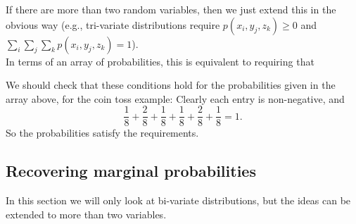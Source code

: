   	\bigskip
	
	\hfil{}
	\bigskip
	\bigskip

\noindent If there are more than two random variables, then we just extend this in the obvious way (e.g., tri-variate distributions require $p(x_i,y_j,z_k) \geq 0$ and $\sum_i\sum_j\sum_kp(x_i,y_j,z_k) = 1$). \\

\noindent In terms of an array of probabilities, this is equivalent to requiring that

  	\bigskip
	
	\hfil{}
	\bigskip
	\bigskip

\noindent We should check that these conditions hold for the probabilities given in the array above, for the coin toss example: Clearly each entry is non-negative, and
\[
\frac{1}{8} + \frac{2}{8} + \frac{1}{8} + \frac{1}{8} + \frac{2}{8} + \frac{1}{8} = 1.
\]
So the probabilities satisfy the requirements. \\

\subsection{Recovering marginal probabilities} \label{marginal probabilities} \label{marginal probability mass functions} \label{p_X(x_i) and p_Y(y_i)}
In this section we will only look at bi-variate distributions, but the ideas can be extended to more than two variables. \\

